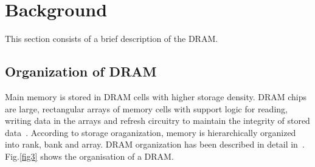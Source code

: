 \section{Background} \label{back}
\noindent
This section consists of a brief description of the DRAM.




\subsection{Organization of DRAM}\label{b1}
\noindent
Main memory is stored in DRAM cells with higher storage density. DRAM chips are large, rectangular arrays of memory 
cells with support logic for reading, writing data in the arrays and refresh circuitry to maintain the 
integrity of stored data~\cite{wiki:xxx1}. According to storage 
oraganization, memory is hierarchically organized into rank, bank and array. DRAM organization has been 
described in detail in~\cite{Wang:2005:MDM:1104471}.
Fig.\ref{fig3} shows the organisation of a DRAM.



